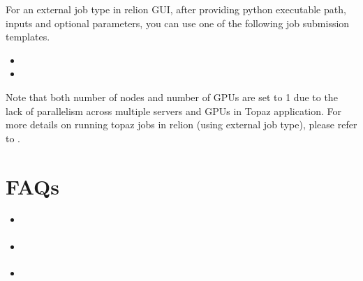 \documentclass[a4paper,10pt,english]{sphinxmanual}
\begin{document}
\sphinxAtStartPar
For an external job type in relion GUI, after providing python executable path, inputs and optional parameters, you can use one of the following job submission templates.
\begin{itemize}
\item {} 
\sphinxAtStartPar
{}

\item {} 
\sphinxAtStartPar
{}

\end{itemize}



\sphinxAtStartPar
Note that both number of nodes and number of GPUs are set to 1 due to the lack of parallelism across multiple servers and GPUs in Topaz application.
For more details on running topaz jobs in relion (using external job type), please refer to .

\sphinxstepscope


\chapter{FAQs}
\label{\detokenize{faq:faqs}}\label{\detokenize{faq::doc}}\begin{itemize}
\item {} 
\sphinxAtStartPar
{\hyperref[\detokenize{faq:how-to-resolve-the-problems-on-re-starting-your-own-cryosparc-instance}]{}}

\item {} 
\sphinxAtStartPar
{\hyperref[\detokenize{faq:how-to-repair-cryosparc-database-corruption-caused-by-duplicated-mongod-executions}]{}}

\item {} 
\sphinxAtStartPar
{\hyperref[\detokenize{faq:how-to-update-cryosparc-softwares}]{}}

\end{itemize}
\end{document}

